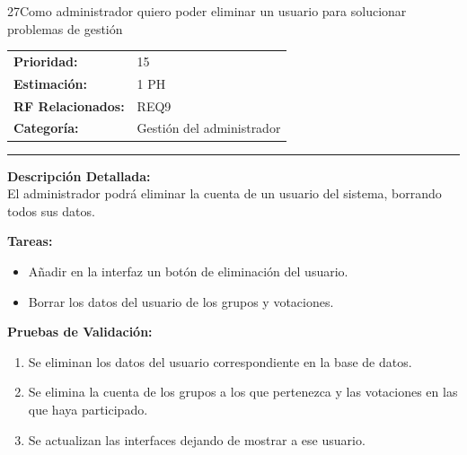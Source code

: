 \begin{hu_card}{27}{Como administrador quiero poder eliminar un usuario para solucionar problemas de gestión}
    \begin{tabularx}{\linewidth}{l X}
        \textbf{Prioridad:}   & 15\\
        \textbf{Estimación:}  & 1 PH \\
        \textbf{RF Relacionados:} & REQ9 \\
        \textbf{Categoría:} & Gestión del administrador \\
    \end{tabularx}

    \vspace{2mm}
    \hrule
    \vspace{2mm}

    \textbf{Descripción Detallada:} \\
    El administrador podrá eliminar la cuenta de un usuario del sistema, borrando todos sus datos.

    \vspace{2mm}
    \textbf{Tareas:}
    \begin{itemize}[noitemsep, topsep=0pt]
        \item Añadir en la interfaz un botón de eliminación del usuario.
        \item Borrar los datos del usuario de los grupos y votaciones.
    \end{itemize}

    \vspace{2mm}
    \textbf{Pruebas de Validación:}
    \begin{enumerate}[noitemsep, topsep=0pt]
        \item Se eliminan los datos del usuario correspondiente en la base de datos.
       \item Se elimina la cuenta de los grupos a los que pertenezca y las votaciones en las que haya participado. 
        \item Se actualizan las interfaces dejando de mostrar a ese usuario.
    \end{enumerate}
\end{hu_card}

